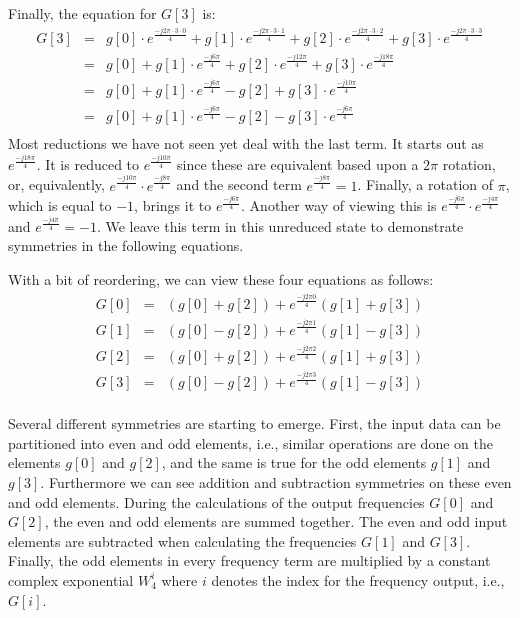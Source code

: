 Finally, the equation for $G[3]$ is:
\begin{equation}
\begin{array} {lll} 
G[3] & = & g[0] \cdot e^{\frac{-j 2 \pi \cdot 3 \cdot 0}{4}} + g[1] \cdot e^{\frac{-j 2 \pi \cdot 3 \cdot 1}{4}} + g[2] \cdot e^{\frac{-j 2 \pi \cdot 3 \cdot 2}{4}} + g[3] \cdot e^{\frac{-j 2 \pi \cdot 3 \cdot 3}{4}}\\
 & = & g[0] + g[1] \cdot e^{\frac{-j  6 \pi}{4}} + g[2] \cdot e^{\frac{-j  12 \pi}{4}} + g[3] \cdot e^{\frac{-j 18 \pi}{4}}\\
 & = & g[0] + g[1] \cdot e^{\frac{-j 6  \pi }{4}}  - g[2] +  g[3] \cdot e^{\frac{-j 10  \pi}{4}}\\
  & = & g[0] + g[1] \cdot e^{\frac{-j 6  \pi }{4}}  - g[2] -  g[3] \cdot e^{\frac{-j 6  \pi}{4}}\\
\end{array} 
\end{equation} Most reductions we have not seen yet deal with the last term. It starts out as $e^{\frac{-j 18 \pi}{4}}$. It is reduced to $e^{\frac{-j 10 \pi}{4}}$ since these are equivalent based upon a $2 \pi$ rotation, or, equivalently, $e^{\frac{-j 10 \pi}{4}} \cdot e^{\frac{-j 8 \pi}{4}}$ and the second term $e^{\frac{-j 8 \pi}{4}} = 1$. Finally, a rotation of $\pi$, which is equal to $-1$, brings it to $e^{\frac{-j 6  \pi}{4}}$. Another way of viewing this is $e^{\frac{-j 6 \pi}{4}} \cdot e^{\frac{-j 4 \pi}{4}}$ and $e^{\frac{-j 4 \pi}{4}} = -1$. We leave this term in this unreduced state to demonstrate symmetries in the following equations.

With a bit of reordering, we can view these four equations as follows:
\begin{equation}
\begin{array} {lll} 
G[0] & = & (g[0] + g[2]) + e^{\frac{-j 2 \pi 0}{4}} (g[1] + g[3])\\
G[1] & = & (g[0] - g[2]) + e^{\frac{-j 2 \pi 1}{4}} (g[1] - g[3])\\
G[2] & = & (g[0] + g[2]) + e^{\frac{-j 2 \pi 2}{4}} (g[1] + g[3])\\
G[3] & = & (g[0] - g[2]) + e^{\frac{-j 2 \pi 3}{4}} (g[1] - g[3])\\
\end{array}
\end{equation}

Several different symmetries are starting to emerge. First, the input data can be partitioned into even and odd elements, i.e., similar operations are done on the elements $g[0]$ and $g[2]$, and the same is true for the odd elements $g[1]$ and $g[3]$. Furthermore we can see addition and subtraction symmetries on these even and odd elements. During the calculations of the output frequencies $G[0]$ and $G[2]$, the even and odd elements are summed together. The even and odd input elements are subtracted when calculating the frequencies $G[1]$ and $G[3]$.  Finally, the odd elements in every frequency term are multiplied by a constant complex exponential $W^i_4$ where $i$ denotes the index for the frequency output, i.e., $G[i]$. 

